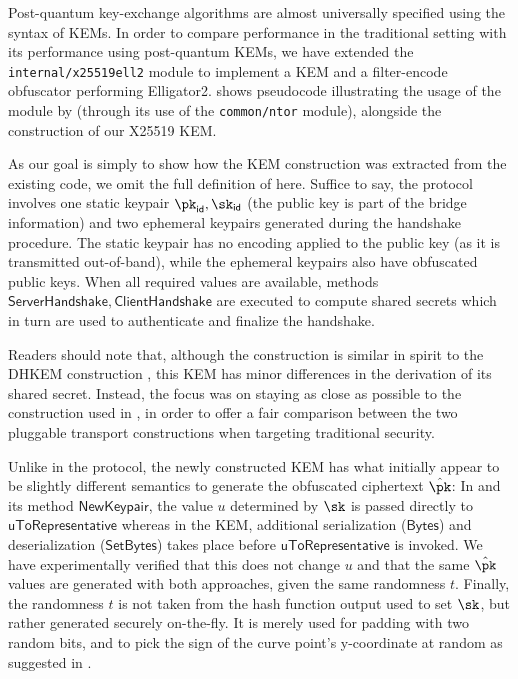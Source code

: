 Post-quantum key-exchange algorithms are almost universally specified using the syntax of KEMs. In order to compare \drivel{} performance in the traditional setting with its performance using post-quantum KEMs, we have extended the \texttt{internal/x25519ell2} module to implement a KEM and a filter-encode obfuscator performing \textsf{Elligator2}.  shows pseudocode illustrating the usage of the module by \obfsfour{} (through its use of the \texttt{common/ntor} module), alongside the construction of our X25519 KEM.

As our goal is simply to show how the KEM construction was extracted from the existing code, we omit the full definition of \obfsfour{} here. Suffice to say, the protocol involves one static keypair $\pk_\mathsf{id}, \sk_\mathsf{id}$ (the public key is part of the bridge information) and two ephemeral keypairs generated during the handshake procedure. The static keypair has no encoding applied to the public key (as it is transmitted out-of-band), while the ephemeral keypairs also have obfuscated public keys. When all required values are available, methods $\mathsf{ServerHandshake}, \mathsf{ClientHandshake}$ are executed to compute shared secrets which in turn are used to authenticate and finalize the handshake.

Readers should note that, although the construction is similar in spirit to the DHKEM construction \cite[Section~4.1]{rfc9180}, this KEM has minor differences in the derivation of its shared secret. Instead, the focus was on staying as close as possible to the construction used in \obfsfour{}, in order to offer a fair comparison between the two pluggable transport constructions when targeting traditional security.

Unlike in the \obfsfour{} protocol, the newly constructed KEM has what initially appear to be slightly different semantics to generate the obfuscated ciphertext $\hat \pk$:
In \obfsfour{} and its method $\mathsf{NewKeypair}$, the value $u$ determined by $\sk$ is passed directly to $\mathsf{uToRepresentative}$ whereas in the KEM, additional serialization ($\mathsf{Bytes}$) and deserialization ($\mathsf{SetBytes}$) takes place before $\mathsf{uToRepresentative}$ is invoked.
We have experimentally verified that this does not change $u$ and that the same $\hat \pk$ values are generated with both approaches, given the same randomness $t$.
Finally, the randomness $t$ is not taken from the hash function output used to set $\sk$, but rather generated securely on-the-fly. It is merely used for padding with two random bits, and to pick the sign of the curve point's y-coordinate at random as suggested in \cite{elligatorExplicitFormulas}.

